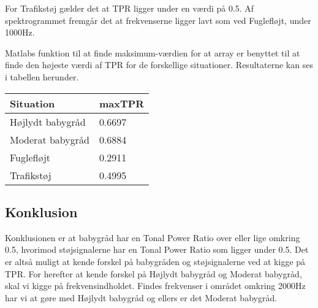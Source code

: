 For Trafikstøj gælder det at TPR ligger under en værdi på 0.5. Af spektrogrammet fremgår det at frekvenserne ligger lavt som ved Fuglefløjt, under 1000Hz. 


Matlabs funktion til at finde maksimum-værdien for at array er benyttet til at finde den højeste værdi af TPR for de forskellige situationer. Resultaterne kan ses i tabellen herunder. 

\begin{center}
    \begin{tabular}{ | l | l |}
    \hline
    \textbf{Situation} & \textbf{maxTPR}  \\ \hline
    Højlydt babygråd & 0.6697   \\ \hline
    Moderat babygråd & 0.6884  \\ \hline
    Fuglefløjt & 0.2911  \\ \hline
    Trafikstøj & 0.4995  \\
    \hline
    \end{tabular}
\end{center}

\subsection{Konklusion}
Konklusionen er at babygråd har en Tonal Power Ratio over eller lige omkring 0.5, hvorimod støjsignalerne har en Tonal Power Ratio som ligger under 0.5. Det er altså muligt at kende forskel på babygråden og støjsignalerne ved at kigge på TPR. For herefter at kende forskel på Højlydt babygråd og Moderat babygråd, skal vi kigge på frekvensindholdet. Findes frekvenser i området omkring 2000Hz har vi at gøre med Højlydt babygråd og ellers er det Moderat babygråd. 
